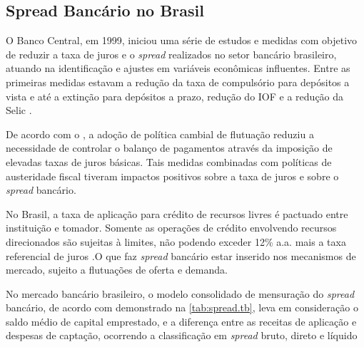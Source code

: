 \documentclass[
  12pt,
  12pt,
  openright,
  oneside,
  a4paper,
  chapter=TITLE,
  section=TITLE,
  subsection=TITLE,
  subsubsection=TITLE,
  portugues,
  sumario=tradicional]{abntex2}
\begin{document}
\subsection{Spread Bancário no Brasil}

O Banco Central, em 1999, iniciou uma série de estudos e medidas com objetivo de reduzir a taxa de juros e o \emph{spread} realizados no setor bancário brasileiro, atuando na identificação e ajustes em variáveis econômicas influentes. Entre as primeiras medidas estavam a redução da taxa de compulsório para depósitos a vista e até a extinção para depósitos a prazo, redução do IOF e a redução da Selic \cite{BCB:2000}.

De acordo com o \textcite{BCB:1999}, a adoção de política cambial de flutuação reduziu a necessidade de controlar o balanço de pagamentos através da imposição de elevadas taxas de juros básicas. Tais medidas combinadas com políticas de austeridade fiscal tiveram impactos positivos sobre a taxa de juros e sobre o \emph{spread} bancário.

No Brasil, a taxa de aplicação para crédito de recursos livres é pactuado entre instituição e tomador. Somente as operações de crédito envolvendo recursos direcionados são sujeitas à limites, não podendo exceder 12\% a.a. mais a taxa referencial de juros \cite{BCB:2016}.O que faz \emph{spread} bancário estar inserido nos mecanismos de mercado, sujeito a flutuações de oferta e demanda.

No mercado bancário brasileiro, o modelo consolidado de mensuração do \emph{spread} bancário, de acordo com demonstrado na \autoref{tab:spread.tb}, leva em consideração o saldo médio de capital emprestado, e a diferença entre as receitas de aplicação e despesas de captação, ocorrendo a classificação em \emph{spread} bruto, direto e líquido \cite{fipecafi:2005}
\end{document}
